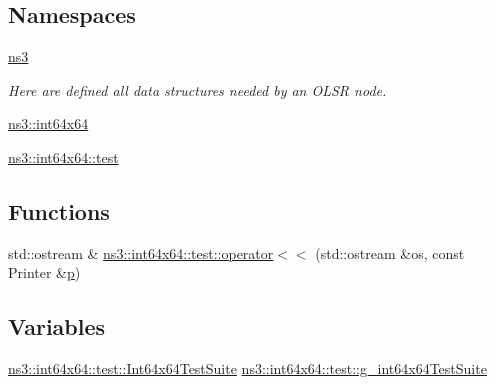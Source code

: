 \subsection*{Namespaces}
\begin{DoxyCompactItemize}
\item 
 \hyperlink{namespacens3}{ns3}
\begin{DoxyCompactList}\small\item\em Here are defined all data structures needed by an O\+L\+SR node. \end{DoxyCompactList}\item 
 \hyperlink{namespacens3_1_1int64x64}{ns3\+::int64x64}
\item 
 \hyperlink{namespacens3_1_1int64x64_1_1test}{ns3\+::int64x64\+::test}
\end{DoxyCompactItemize}
\subsection*{Functions}
\begin{DoxyCompactItemize}
\item 
std\+::ostream \& \hyperlink{namespacens3_1_1int64x64_1_1test_a9a3de58e74671ced4615b1dc76e4f4e5}{ns3\+::int64x64\+::test\+::operator$<$$<$} (std\+::ostream \&os, const Printer \&\hyperlink{lte__link__budget__x2__handover__measures_8m_ac9de518908a968428863f829398a4e62}{p})
\end{DoxyCompactItemize}
\subsection*{Variables}
\begin{DoxyCompactItemize}
\item 
\hyperlink{classns3_1_1int64x64_1_1test_1_1Int64x64TestSuite}{ns3\+::int64x64\+::test\+::\+Int64x64\+Test\+Suite} \hyperlink{namespacens3_1_1int64x64_1_1test_a1d1e87d28622f2b6430e749acaf43e13}{ns3\+::int64x64\+::test\+::g\+\_\+int64x64\+Test\+Suite}
\end{DoxyCompactItemize}
